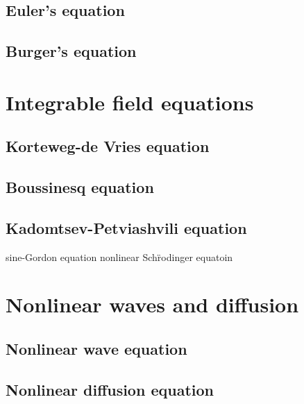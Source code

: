 \documentclass{../note}
\begin{document}
\section{Euler's equation}
\section{Burger's equation}

\chapter{Integrable field equations}
\section{Korteweg-de Vries equation}
\section{Boussinesq equation}
\section{Kadomtsev-Petviashvili equation}

sine-Gordon equation
nonlinear Sch\"rodinger equatoin

\chapter{Nonlinear waves and diffusion}
\section{Nonlinear wave equation}
\section{Nonlinear diffusion equation}
\end{document}
